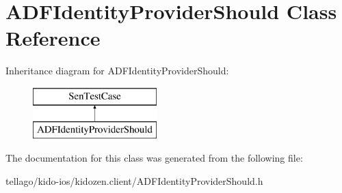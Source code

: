 \hypertarget{interface_a_d_f_identity_provider_should}{\section{A\-D\-F\-Identity\-Provider\-Should Class Reference}
\label{interface_a_d_f_identity_provider_should}
}
Inheritance diagram for A\-D\-F\-Identity\-Provider\-Should\-:\begin{figure}[H]
\begin{center}
\leavevmode
\includegraphics[height=2.000000cm]{interface_a_d_f_identity_provider_should}
\end{center}
\end{figure}


The documentation for this class was generated from the following file\-:\begin{DoxyCompactItemize}
\item 
tellago/kido-\/ios/kidozen.\-client/A\-D\-F\-Identity\-Provider\-Should.\-h\end{DoxyCompactItemize}
